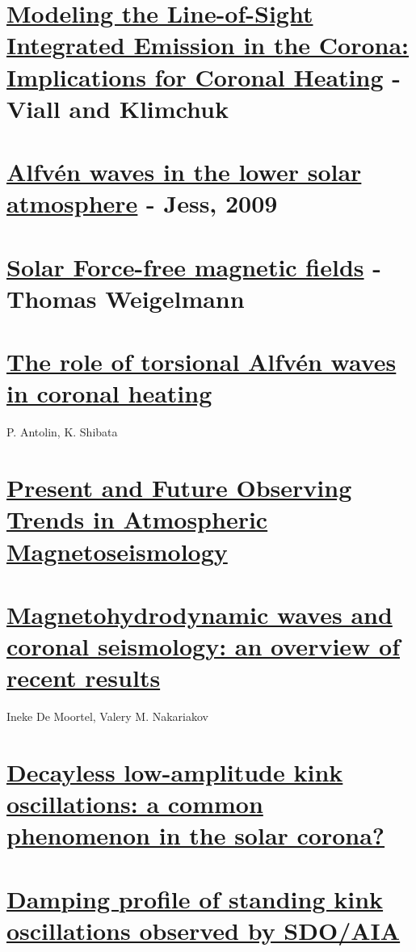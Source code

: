 \documentclass{article}
\begin{document}
\section{%
    \href{http://arxiv.org/abs/1304.5439}
    {Modeling the Line-of-Sight Integrated Emission in the Corona:
    Implications for Coronal Heating}
    - Viall and Klimchuk}
\section{%
    \href{http://arxiv.org/abs/0903.3546}
    {Alfv\'en waves in the lower solar atmosphere}
    - Jess, 2009}

\section{%
    \href{https://arxiv.org/abs/1208.4693}
    {Solar Force-free magnetic fields}
    - Thomas Weigelmann
}
\section{%
    \href{https://arxiv.org/abs/0910.0962}
    {The role of torsional Alfv\'en waves in coronal heating}}
    P. Antolin, K. Shibata

\section{%
\href{http://link.springer.com/article/10.1007\%2Fs11207-007-9029-z}
{Present and Future Observing Trends in Atmospheric Magnetoseismology}}

\section{%
\href{http://rsta.royalsocietypublishing.org/content/370/1970/3193}
{Magnetohydrodynamic waves and coronal seismology: an overview of recent results}}
Ineke De Moortel, Valery M. Nakariakov

\section{%
\href{http://arxiv.org/abs/1509.05519}
{Decayless low-amplitude kink oscillations: a common phenomenon in the solar corona?}}

\section{%
\href{http://adsabs.harvard.edu/abs/2016A\%26A...585L...6P}
{Damping profile of standing kink oscillations observed by SDO/AIA}
}
\end{document}

